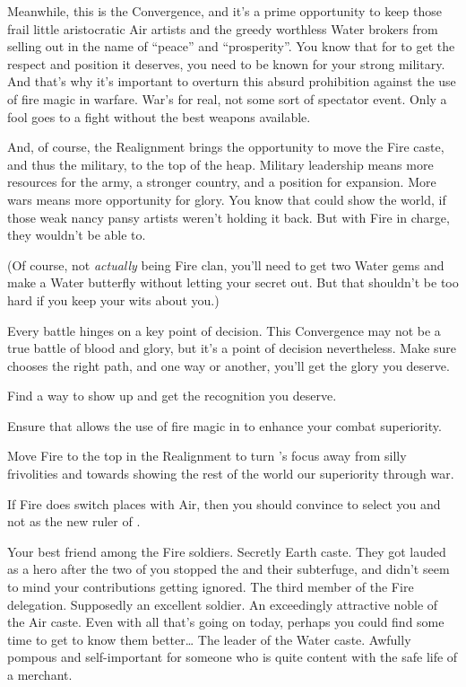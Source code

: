 \documentclass[char]{iron}
\begin{document}
Meanwhile, this is the Convergence, and it's a prime opportunity to
keep those frail little aristocratic Air artists and the greedy
worthless Water brokers from selling out \sHomeCountry{} in the name
of ``peace'' and ``prosperity''.  You know that for \sHomeCountry{} to get
the respect and position it deserves, you need to be known for your
strong military.  And that's why it's important to overturn this absurd
prohibition against the use of fire magic in warfare.  War's for real, not
some sort of spectator event.  Only a fool goes to a fight without
the best weapons available.

And, of course, the Realignment brings the opportunity to move the
Fire caste, and thus the military, to the top of the heap.  Military
leadership means more resources for the army, a stronger country, and
a position for expansion.  More wars means more opportunity for glory.
You know that \sHomeCountry{} could show the world, if those weak
nancy pansy artists weren't holding it back.  But with Fire in charge,
they wouldn't be able to.

(Of course, not \emph{actually} being Fire clan, you'll need to get
two Water gems and make a Water butterfly without letting your secret out.
But that shouldn't be too hard if you keep your wits about you.)

Every battle hinges on a key point of decision.  This Convergence may
not be a true battle of blood and glory, but it's a point of decision
nevertheless.  Make sure \sHomeCountry{} chooses the right path, and one
way or another, you'll get the glory you deserve.

\begin{itemz}[Goals]
\item Find a way to show up \cMulan{} and get the recognition you deserve.
\item Ensure that \sHomeCountry{} allows the use of fire magic in to enhance
  your combat superiority.
\item Move Fire to the top in the Realignment to turn \sHomeCountry{}'s
  focus away from silly frivolities and towards showing the rest of the world
  our superiority through war.
\item If Fire does switch places with Air, then you should convince \cRoyalty{} to select you and not \cMulan{} as the new ruler of \sHomeCountry{}.
\end{itemz}

\begin{contacts}
\contact{\cMulan{}} Your best friend among the Fire soldiers.  Secretly
Earth caste.  They got lauded as a hero after the two of you stopped
the \sMulanCountryPeople{} and their subterfuge, and didn't seem to mind
your contributions getting ignored.
\contact{\cRealPriest{}} The third member of the Fire delegation.  Supposedly
an excellent soldier.
\contact{\cHotPerson{}} An exceedingly attractive noble of the Air caste. Even with all that's going on today, perhaps you could find some time to get to know them better\ldots{}
\contact{\cGuildmaster{}} The leader of the Water caste. Awfully pompous and self-important for someone who is quite content with the safe life of a merchant.
\end{contacts}
\end{document}
